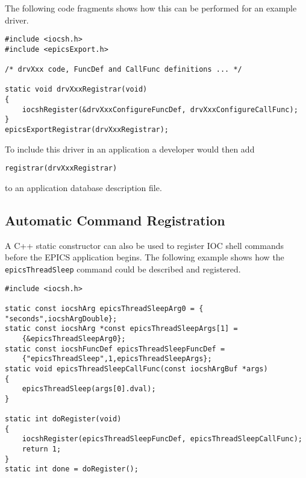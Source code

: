 The following code fragments shows how this can be performed for an example driver.

\begin{verbatim}
#include <iocsh.h>
#include <epicsExport.h>

/* drvXxx code, FuncDef and CallFunc definitions ... */

static void drvXxxRegistrar(void)
{
    iocshRegister(&drvXxxConfigureFuncDef, drvXxxConfigureCallFunc);
}
epicsExportRegistrar(drvXxxRegistrar);
\end{verbatim}

To include this driver in an application a developer would then add

\begin{verbatim}
registrar(drvXxxRegistrar)
\end{verbatim}

to an application database description file.

\subsection{Automatic Command Registration}

A C++ static constructor can also be used to register IOC shell commands before the EPICS application begins.
The following example shows how the \verb|epicsThreadSleep| command could be described and registered.

\begin{verbatim}
#include <iocsh.h>

static const iocshArg epicsThreadSleepArg0 = { "seconds",iocshArgDouble};
static const iocshArg *const epicsThreadSleepArgs[1] =
    {&epicsThreadSleepArg0};
static const iocshFuncDef epicsThreadSleepFuncDef =
    {"epicsThreadSleep",1,epicsThreadSleepArgs};
static void epicsThreadSleepCallFunc(const iocshArgBuf *args)
{
    epicsThreadSleep(args[0].dval);
}

static int doRegister(void)
{
    iocshRegister(epicsThreadSleepFuncDef, epicsThreadSleepCallFunc);
    return 1;
}
static int done = doRegister();
\end{verbatim}


